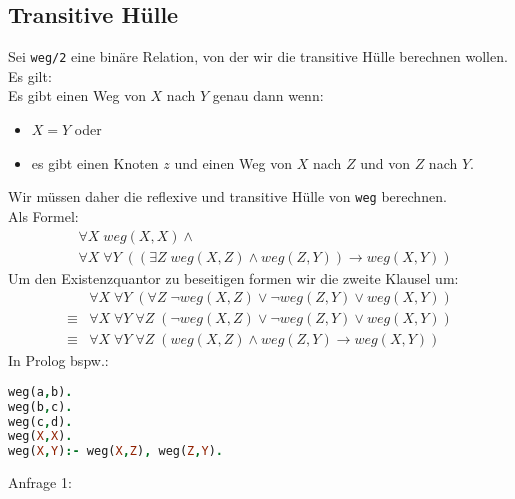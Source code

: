 \subsection{Transitive Hülle}
Sei \lstinline$weg/2$ eine binäre Relation, von der wir die transitive Hülle  berechnen wollen. Es gilt:\\
Es gibt einen Weg von $X$ nach $Y$ genau dann wenn:
\begin{itemize}
\item $X=Y$ oder
\item es gibt einen Knoten $z$ und einen Weg von $X$ nach $Z$ und von $Z$ nach $Y$.
\end{itemize}
Wir müssen daher die reflexive und transitive Hülle von \lstinline$weg$ berechnen.\\
Als Formel:
\begin{align*}
&\forall X\; weg(X,X) \wedge\\
&\forall X \;\forall Y \; ((\exists Z\; weg(X,Z) \wedge weg(Z,Y)) \to weg(X,Y))
\end{align*}
Um den Existenzquantor zu beseitigen formen wir die zweite Klausel um:
\begin{align*}
&\forall X\; \forall Y\; (\forall Z\; \neg weg(X,Z) \vee \neg weg(Z,Y) \vee weg(X,Y))\\
\equiv & \forall X\; \forall Y\; \forall Z\;(\neg weg(X,Z) \vee \neg weg(Z,Y) \vee weg(X,Y))\\
\equiv& \forall X\; \forall Y\; \forall Z\;( weg(X,Z) \wedge weg(Z,Y) \to weg(X,Y))
\end{align*}
In Prolog bspw.:
\begin{lstlisting}[language=Prolog]
weg(a,b).
weg(b,c).
weg(c,d).
weg(X,X).
weg(X,Y):- weg(X,Z), weg(Z,Y).
\end{lstlisting}
Anfrage 1:
\begin{center}
\end{center}
